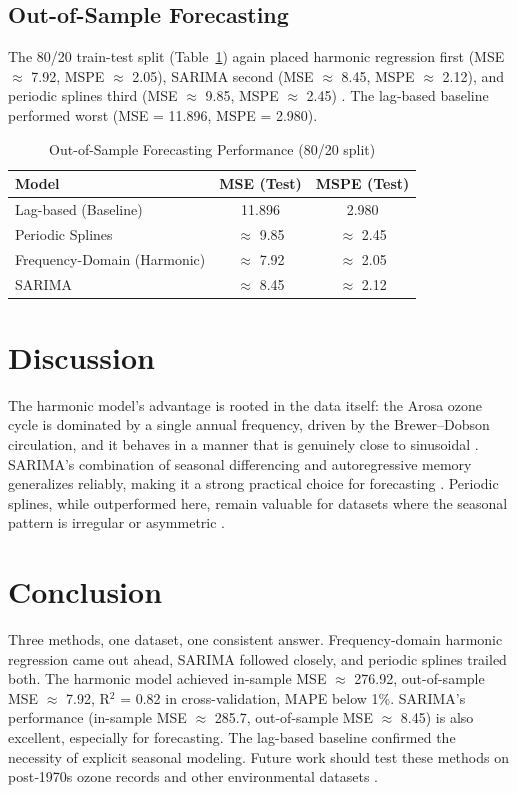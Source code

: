 \documentclass[12pt,a4paper]{article}
\begin{document}
\subsection{Out-of-Sample Forecasting}
The 80/20 train-test split (Table~\ref{tab:oos}) again placed harmonic regression first (MSE $\approx$ 7.92, MSPE $\approx$ 2.05), SARIMA second (MSE $\approx$ 8.45, MSPE $\approx$ 2.12), and periodic splines third (MSE $\approx$ 9.85, MSPE $\approx$ 2.45) \cite{Box2015}. The lag‑based baseline performed worst (MSE = 11.896, MSPE = 2.980).

\begin{table}[htbp]
\centering
\caption{Out-of-Sample Forecasting Performance (80/20 split)}
\label{tab:oos}
\begin{tabular}{lcc}
\toprule
\textbf{Model} & \textbf{MSE (Test)} & \textbf{MSPE (Test)} \\
\midrule
Lag-based (Baseline) & 11.896 & 2.980 \\
Periodic Splines & $\approx$ 9.85 & $\approx$ 2.45 \\
Frequency-Domain (Harmonic) & $\approx$ 7.92 & $\approx$ 2.05 \\
SARIMA & $\approx$ 8.45 & $\approx$ 2.12 \\
\bottomrule
\end{tabular}
\end{table}

\section{Discussion}
The harmonic model's advantage is rooted in the data itself: the Arosa ozone cycle is dominated by a single annual frequency, driven by the Brewer–Dobson circulation, and it behaves in a manner that is genuinely close to sinusoidal \cite{Staehelin2001}. SARIMA's combination of seasonal differencing and autoregressive memory generalizes reliably, making it a strong practical choice for forecasting \cite{Hyndman2021, Box2015}. Periodic splines, while outperformed here, remain valuable for datasets where the seasonal pattern is irregular or asymmetric \cite{Wood2017}.

\section{Conclusion}
Three methods, one dataset, one consistent answer. Frequency-domain harmonic regression came out ahead, SARIMA followed closely, and periodic splines trailed both. The harmonic model achieved in-sample MSE $\approx$ 276.92, out-of-sample MSE $\approx$ 7.92, R$^2$ = 0.82 in cross-validation, MAPE below 1\%. SARIMA's performance (in-sample MSE $\approx$ 285.7, out-of-sample MSE $\approx$ 8.45) is also excellent, especially for forecasting. The lag-based baseline confirmed the necessity of explicit seasonal modeling. Future work should test these methods on post‑1970s ozone records and other environmental datasets \cite{Wood2017}.
\end{document}
